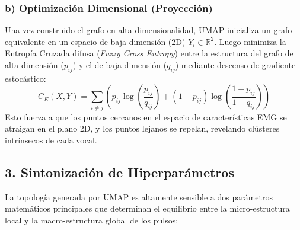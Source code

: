\documentclass[12pt, a4paper]{article}
\begin{document}
\subsubsection{b) Optimización Dimensional (Proyección)}
Una vez construido el grafo en alta dimensionalidad, UMAP inicializa un grafo equivalente en un espacio de baja dimensión (2D) $Y_i \in \mathbb{R}^2$. Luego minimiza la Entropía Cruzada difusa (\textit{Fuzzy Cross Entropy}) entre la estructura del grafo de alta dimensión ($p_{ij}$) y el de baja dimensión ($q_{ij}$) mediante descenso de gradiente estocástico:
\[
C_E(X, Y) = \sum_{i \neq j} \left( p_{ij} \log\left(\frac{p_{ij}}{q_{ij}}\right) + (1 - p_{ij}) \log\left(\frac{1 - p_{ij}}{1 - q_{ij}}\right) \right)
\]
Esto fuerza a que los puntos cercanos en el espacio de características EMG se atraigan en el plano 2D, y los puntos lejanos se repelan, revelando clústeres intrínsecos de cada vocal.

\subsection{3. Sintonización de Hiperparámetros}
La topología generada por UMAP es altamente sensible a dos parámetros matemáticos principales que determinan el equilibrio entre la micro-estructura local y la macro-estructura global de los pulsos:
\end{document}
